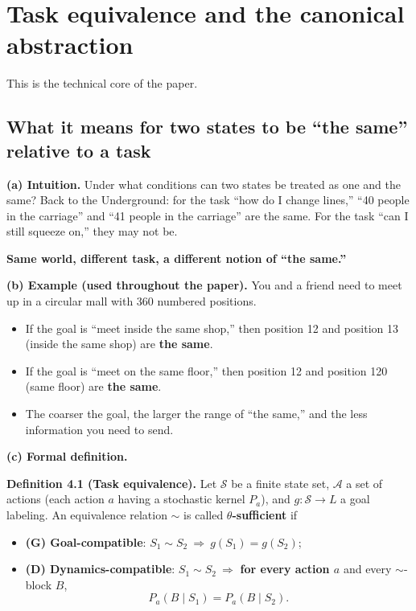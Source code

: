 \documentclass[11pt]{article}
\providecommand{\tightlist}{%
  \setlength{\itemsep}{0pt}\setlength{\parskip}{0pt}}
\renewenvironment{quote}
  {\def\FrameCommand{{\color{gray!60}\vrule width 2pt}\hspace{8pt}}%
   \MakeFramed{\advance\hsize-\width \FrameRestore}\begin{itshape}}
  {\end{itshape}\endMakeFramed}
\begin{document}
\hypertarget{task-equivalence-and-the-canonical-abstraction}{%
\section{Task equivalence and the canonical abstraction}\label{task-equivalence-and-the-canonical-abstraction}}

This is the technical core of the paper.

\hypertarget{what-it-means-for-two-states-to-be-the-same-relative-to-a-task}{%
\subsection{What it means for two states to be ``the same'' relative to a task}\label{what-it-means-for-two-states-to-be-the-same-relative-to-a-task}}

\textbf{(a) Intuition.} Under what conditions can two states be treated as one and the same? Back to the Underground: for the task ``how do I change lines,'' ``40 people in the carriage'' and ``41 people in the carriage'' are the same. For the task ``can I still squeeze on,'' they may not be.

\textbf{Same world, different task, a different notion of ``the same.''}

\textbf{(b) Example (used throughout the paper).} You and a friend need to meet up in a circular mall with 360 numbered positions.

\begin{itemize}
\tightlist
\item
  If the goal is ``meet inside the same shop,'' then position 12 and position 13 (inside the same shop) are \textbf{the same}.
\item
  If the goal is ``meet on the same floor,'' then position 12 and position 120 (same floor) are \textbf{the same}.
\item
  The coarser the goal, the larger the range of ``the same,'' and the less information you need to send.
\end{itemize}

\textbf{(c) Formal definition.}

\begin{quote}
\textbf{Definition 4.1 (Task equivalence).} Let \(\mathcal S\) be a finite state set, \(\mathcal A\) a set of actions (each action \(a\) having a stochastic kernel \(P_a\)), and \(g:\mathcal S\to L\) a goal labeling. An equivalence relation \(\sim\) is called \textbf{\(\theta\)-sufficient} if

\begin{itemize}
\tightlist
\item
  \textbf{(G) Goal-compatible}: \(S_1\sim S_2\ \Rightarrow\ g(S_1)=g(S_2)\);
\item
  \textbf{(D) Dynamics-compatible}: \(S_1\sim S_2\ \Rightarrow\) \textbf{for every action \(a\)} and every \(\sim\)-block \(B\),
  \[P_a(B\mid S_1)=P_a(B\mid S_2).\]
\end{itemize}
\end{quote}
\end{document}
